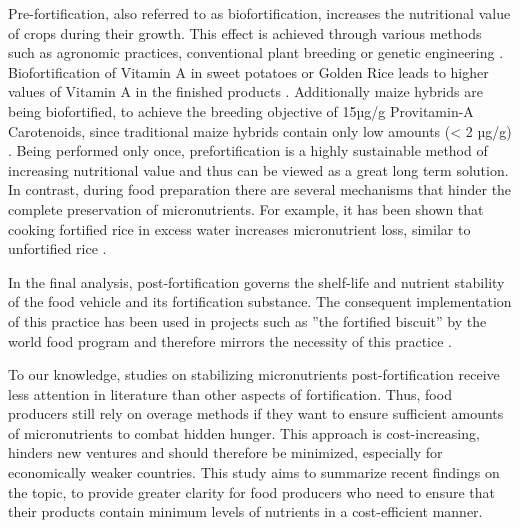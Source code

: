 Pre-fortification, also referred to as biofortification, increases the nutritional value of crops during their growth. This effect is achieved through various methods such as agronomic practices, conventional plant breeding or genetic engineering \autocite{1ofori}. Biofortification of Vitamin A in sweet potatoes or Golden Rice leads to higher values of Vitamin A in the finished products \autocite{1ofori}. Additionally maize hybrids are being biofortified, to achieve the breeding objective of 15µg/g Provitamin-A Carotenoids, since traditional maize hybrids contain only low amounts (< 2 µg/g) \autocite{dutta}. Being performed only once, prefortification is a highly sustainable method of increasing nutritional value and thus can be viewed as a great long term solution. In contrast, during food preparation there are several mechanisms that hinder the complete preservation of micronutrients. For example, it has been shown that cooking fortified rice in excess water increases micronutrient loss, similar to unfortified rice \autocite{10rice}. 

In the final analysis, post-fortification governs the shelf-life and nutrient stability of the food vehicle and its fortification substance. The consequent implementation of this practice has been used in projects such as ”the fortified biscuit” by the world food program and therefore mirrors the necessity of this practice \autocite{wfp}. \par

To our knowledge, studies on stabilizing micronutrients post-fortification receive less attention in literature than other aspects of fortification. Thus, food producers still rely on overage methods if they want to ensure sufficient amounts of micronutrients to combat hidden hunger. This approach is cost-increasing, hinders new ventures and should therefore be minimized, especially for economically weaker countries. This study aims to summarize recent findings on the topic, to provide greater clarity for food producers who need to ensure that their products contain minimum levels of nutrients in a cost-efficient manner. 
